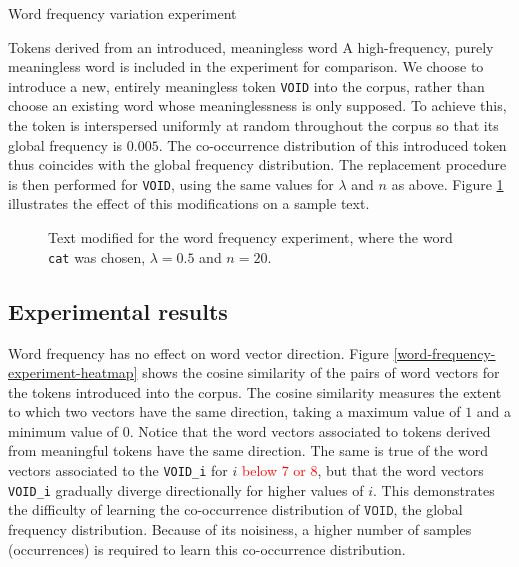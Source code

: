\documentclass{article} %
\newcommand{\word}[1]{\texttt{#1}}
\begin{document}
\begin{section}{Word frequency variation experiment}
\begin{subsection}{Tokens derived from an introduced, meaningless word}
	A high-frequency, purely meaningless word is included in the experiment for comparison.
	We choose to introduce a new, entirely meaningless token \word{VOID} into the corpus, rather than choose an existing word whose meaninglessness is only supposed.
	To achieve this, the token is interspersed uniformly at random throughout the corpus so that its global frequency is $0.005$.
	The co-occurrence distribution of this introduced token thus coincides with the global frequency distribution.
	The replacement procedure is then performed for \word{VOID}, using the same values for $\lambda$ and $n$ as above.
Figure \ref{fig:word-frequency-experiment-text-void} illustrates the effect of this modifications on a sample text.

\begin{figure}\label{fig:word-frequency-experiment-text-void}
	
	\caption{Text modified for the word frequency experiment, where the
	word \word{cat} was chosen, $\lambda=0.5$ and $n=20$.}
\end{figure}
\end{subsection}

\subsection{Experimental results}
Word frequency has no effect on word vector direction.
Figure \ref{word-frequency-experiment-heatmap} shows the cosine similarity of the pairs of word vectors for the tokens introduced into the corpus.
The cosine similarity measures the extent to which two vectors have the same direction, taking a maximum value of $1$ and a minimum value of $0$.
Notice that the word vectors associated to tokens derived from meaningful tokens have the same direction.
The same is true of the word vectors associated to the \word{VOID\_i} for $i$ \textcolor{red}{below $7$ or $8$}, but that the word vectors \word{VOID\_i} gradually diverge directionally for higher values of $i$.
This demonstrates the difficulty of learning the co-occurrence distribution of $\word{VOID}$, the global frequency distribution.
Because of its noisiness, a higher number of samples (occurrences) is required to learn this co-occurrence distribution.


\end{section}
\end{document}
